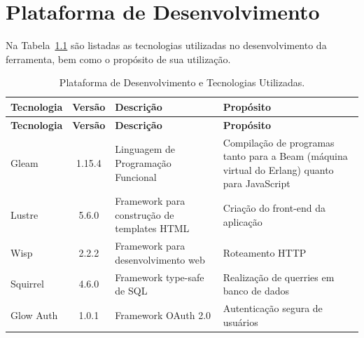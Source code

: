\chapter{Plataforma de Desenvolvimento}
\label{sec-plataforma}
\vspace{-1cm}





Na Tabela~\ref{tabela-plataforma} são listadas as tecnologias utilizadas no desenvolvimento da ferramenta, bem como o propósito de sua utilização.

\begin{footnotesize}
\begin{longtable}{|p{2.5cm}|c|p{5cm}|p{5.5cm}|}
	\caption{Plataforma de Desenvolvimento e Tecnologias Utilizadas.}	
	\label{tabela-plataforma}\\\hline

	\rowcolor{lightgray}
	\textbf{Tecnologia} & \textbf{Versão} & \textbf{Descrição} & \textbf{Propósito} \\\hline 
	\endfirsthead
	\hline
	\rowcolor{lightgray}
	\textbf{Tecnologia} & \textbf{Versão} & \textbf{Descrição} & \textbf{Propósito} \\\hline 
	\endhead
		
	Gleam & 1.15.4 & Linguagem de Programação Funcional & Compilação de programas tanto para a Beam (máquina virtual do Erlang) quanto para JavaScript \\ \hline
	Lustre & 5.6.0 & Framework para construção de templates HTML & Criação do front-end da aplicação \\ \hline
	Wisp & 2.2.2 & Framework para desenvolvimento web & Roteamento HTTP \\ \hline
	Squirrel & 4.6.0 & Framework type-safe de SQL & Realização de querries em banco de dados \\ \hline
	Glow Auth & 1.0.1 & Framework OAuth 2.0 & Autenticação segura de usuários \\ \hline

\end{longtable}
\end{footnotesize}






